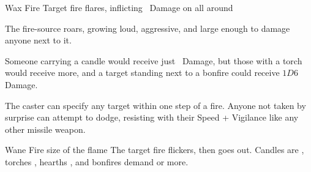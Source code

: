   {}%
  {Wax}%
  {Fire}%
  {}%
  {Target fire flares, inflicting \showDam\ Damage on all around}%
  {The fire-source roars, growing loud, aggressive, and large enough to damage anyone next to it.

    Someone carrying a candle would receive just \showDam\ Damage, but those with a torch would receive more, and a target standing next to a bonfire could receive $1D6$ Damage.

    The caster can specify any target within one step of a fire.
    Anyone not taken by surprise can attempt to dodge, resisting with their Speed + Vigilance like any other missile weapon.
  }

  {}%
  {Wane}%
  {Fire}%
  {size of the flame}%
  {The target fire flickers, then goes out.
}%
  {Candles are \tn[6], torches \tn[7], hearths \tn[8], and bonfires demand \tn[9] or more.}
